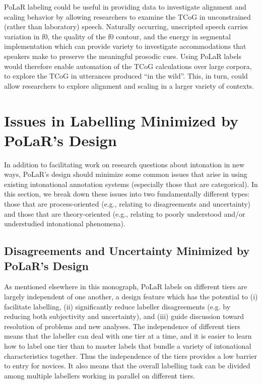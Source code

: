 PoLaR labeling could be useful in providing data to investigate alignment and scaling behavior by allowing researchers to examine the TCoG in unconstrained (rather than laboratory) speech. Naturally occurring, unscripted speech carries variation in f0, the quality of the f0 contour, and the energy in segmental implementation which can provide variety to investigate accommodations that speakers make to preserve the meaningful prosodic cues.  Using PoLaR labels would therefore enable automation of the TCoG calculations over large corpora, to explore the TCoG in utterances produced “in the wild”. This, in turn, could allow researchers to explore alignment and scaling in a larger variety of contexts. 


\section{Issues in Labelling Minimized by PoLaR’s Design}\label{sec:logistical-issues-in-labelling}

In addition to facilitating work on research questions about intonation in new ways, PoLaR’s design should minimize some common issues that arise in using existing intonational annotation systems (especially those that are categorical). In this section, we break down these issues into two fundamentally different types: those that are process-oriented (e.g., relating to disagreements and uncertainty) and those that are theory-oriented (e.g., relating to poorly understood and/or understudied intonational phenomena).

\subsection{Disagreements and Uncertainty Minimized by PoLaR’s Design}\label{sec:reducing-inter-labeller-disagreement}

As mentioned elsewhere in this monograph, PoLaR labels on different tiers are largely independent of one another, a design feature which has the potential to (i) facilitate labelling, (ii) significantly reduce labeller disagreements (e.g.  by reducing both subjectivity and uncertainty), and (iii) guide discussion toward resolution of problems and new analyses. The independence of different tiers means that the labeller can deal with one tier at a time, and it is easier to learn how to label one tier than to master labels that bundle a variety of intonational characteristics together.  Thus the independence of the tiers provides a low barrier to entry for novices. It also means that the overall labelling task can be divided among multiple labellers working in parallel on different tiers.

